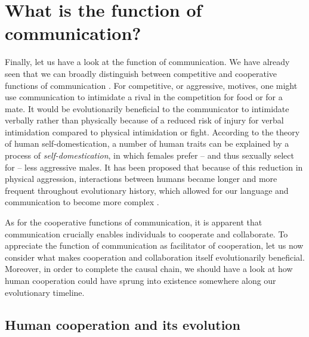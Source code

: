 \section{What is the function of communication?}
\label{sec:comm:function}

Finally, let us have a look at the function of communication.
We have already seen that we can broadly distinguish between competitive and cooperative functions of communication \citep{SeyfarthCheney03}.
For competitive, or aggressive, motives, one might use communication to intimidate a rival in the competition for food or for a mate. It would be evolutionarily beneficial to the communicator to intimidate verbally rather than physically because of a reduced risk of injury for verbal intimidation compared to physical intimidation or fight.
According to the theory of human self-domestication, a number of human traits can be explained by a process of \emph{self-domestication}, in which females prefer -- and thus sexually select for -- less aggressive males. It has been proposed that because of this reduction in physical aggression, interactions between humans became longer and more frequent throughout evolutionary history, which allowed for our language and communication to become more complex \citep{Benitez21}.

As for the cooperative functions of communication, it is apparent that communication crucially enables individuals to cooperate and collaborate.
To appreciate the function of communication as facilitator of cooperation, let us now consider what makes cooperation and collaboration itself evolutionarily beneficial. Moreover, in order to complete the causal chain, we should have a look at how human cooperation could have sprung into existence somewhere along our evolutionary timeline.

\subsection{Human cooperation and its evolution}

